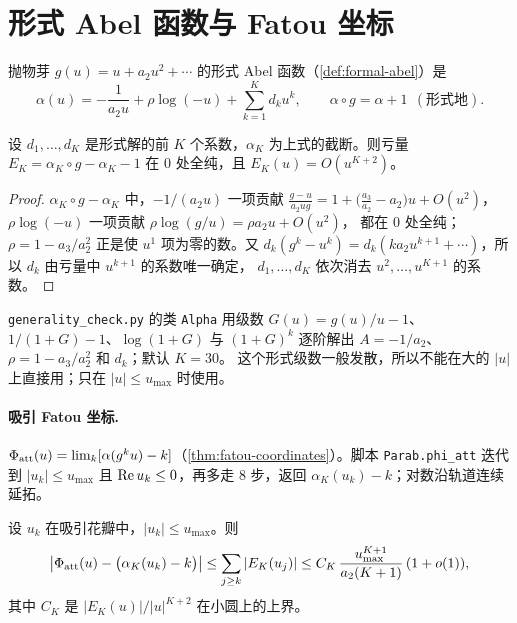 \section{形式 Abel 函数与 Fatou 坐标}\label{ch11:sec:fatou}

抛物芽 $g(u)=u+a_2u^2+\cdots$ 的形式 Abel 函数（\cref{def:formal-abel}）是
\[
 \alpha(u)=-\frac1{a_2u}+\rho\log(-u)+\sum_{k=1}^Kd_ku^k,\qquad \alpha\circ g=\alpha+1\ \ (\text{形式地}) .
\]

\begin{lemma}\label{ch11:lem:defect}
设 $d_1,\dots,d_K$ 是形式解的前 $K$ 个系数，$\alpha_K$ 为上式的截断。则亏量 $E_K=\alpha_K\circ g-\alpha_K-1$ 在 $0$ 处全纯，且 $E_K(u)=O(u^{K+2})$。
\end{lemma}

\begin{proof}
$\alpha_K\circ g-\alpha_K$ 中，$-1/(a_2u)$ 一项贡献 $\frac{g-u}{a_2ug}=1+\bigl(\frac{a_3}{a_2}-a_2\bigr)u+O(u^2)$，$\rho\log(-u)$ 一项贡献 $\rho\log(g/u)=\rho a_2u+O(u^2)$，
都在 $0$ 处全纯；$\rho=1-a_3/a_2^2$ 正是使 $u^1$ 项为零的数。又 $d_k(g^k-u^k)=d_k(ka_2u^{k+1}+\cdots)$，所以 $d_k$ 由亏量中 $u^{k+1}$ 的系数唯一确定，
$d_1,\dots,d_K$ 依次消去 $u^2,\dots,u^{K+1}$ 的系数。
\end{proof}

\texttt{generality\_\allowbreak{}check.py} 的类 \texttt{Alpha} 用级数 $G(u)=g(u)/u-1$、$1/(1+G)-1$、$\log(1+G)$ 与 $(1+G)^k$ 逐阶解出 $A=-1/a_2$、$\rho=1-a_3/a_2^2$ 和 $d_k$；默认 $K=30$。
这个形式级数一般发散，所以不能在大的 $|u|$ 上直接用；只在 $|u|\le u_{\max}$ 时使用。

\paragraph{吸引 Fatou 坐标.} $\Phi_{\mathrm{att}}(u)=\lim_k[\alpha(g^ku)-k]$（\cref{thm:fatou-coordinates}）。脚本 \texttt{Parab.phi\_\allowbreak{}att} 迭代到
$|u_k|\le u_{\max}$ 且 $\operatorname{Re} u_k\le0$，再多走 $8$ 步，返回 $\alpha_K(u_k)-k$；对数沿轨道连续延拓。

\begin{proposition}[截断误差]\label{ch11:prop:fatou-error}
设 $u_k$ 在吸引花瓣中，$|u_k|\le u_{\max}$。则
\[
 \bigl|\Phi_{\mathrm{att}}(u)-\bigl(\alpha_K(u_k)-k\bigr)\bigr|\le\sum_{j\ge k}|E_K(u_j)|\le C_K\,\frac{u_{\max}^{K+1}}{a_2(K+1)}\,(1+o(1)),
\]
其中 $C_K$ 是 $|E_K(u)|/|u|^{K+2}$ 在小圆上的上界。
\end{proposition}

